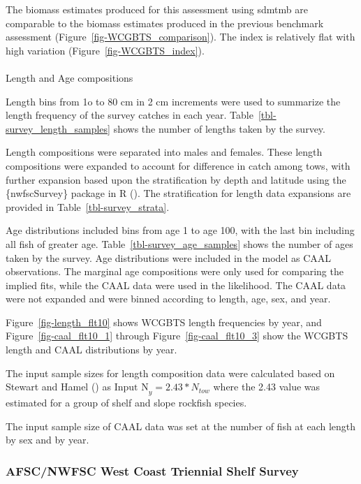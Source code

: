 \documentclass[
]{scrartcl}
\makeatletter
\let\oldparagraph\paragraph
\renewcommand{\paragraph}{
    \@ifstar
      \xxxParagraphStar
      \xxxParagraphNoStar
  }
\newcommand{\xxxParagraphStar}[1]{\oldparagraph*{#1}\mbox{}}
\newcommand{\xxxParagraphNoStar}[1]{\oldparagraph{#1}\mbox{}}
\makeatother
\begin{document}
The biomass estimates produced for this assessment using \gls{sdmtmb}
are comparable to the biomass estimates produced in the previous
benchmark assessment (Figure~\ref{fig-WCGBTS_comparison}). The index is
relatively flat with high variation (Figure~\ref{fig-WCGBTS_index}).

\paragraph{Length and Age
compositions}\label{length-and-age-compositions}

Length bins from 1o to 80 cm in 2 cm increments were used to summarize
the length frequency of the survey catches in each year.
Table~\ref{tbl-survey_length_samples} shows the number of lengths taken
by the survey.

Length compositions were separated into males and females. These length
compositions were expanded to account for difference in catch among
tows, with further expansion based upon the stratification by depth and
latitude using the \{nwfscSurvey\} package in R
(). The stratification for length data expansions are provided in
Table~\ref{tbl-survey_strata}.

Age distributions included bins from age 1 to age 100, with the last bin
including all fish of greater age. Table~\ref{tbl-survey_age_samples}
shows the number of ages taken by the survey. Age distributions were
included in the model as CAAL observations. The marginal age
compositions were only used for comparing the implied fits, while the
CAAL data were used in the likelihood. The CAAL data were not expanded
and were binned according to length, age, sex, and year.

Figure~\ref{fig-length_flt10} shows WCGBTS length frequencies by year,
and Figure~\ref{fig-caal_flt10_1} through Figure~\ref{fig-caal_flt10_3}
show the WCGBTS length and CAAL distributions by year.

The input sample sizes for length composition data were calculated based
on Stewart and Hamel ()
as \(\text{Input N}_{y} = 2.43*N_{tow}\) where the 2.43 value was
estimated for a group of shelf and slope rockfish species.

The input sample size of CAAL data was set at the number of fish at each
length by sex and by year.

\subsubsection{AFSC/NWFSC West Coast Triennial Shelf
Survey}\label{afscnwfsc-west-coast-triennial-shelf-survey}
\end{document}
